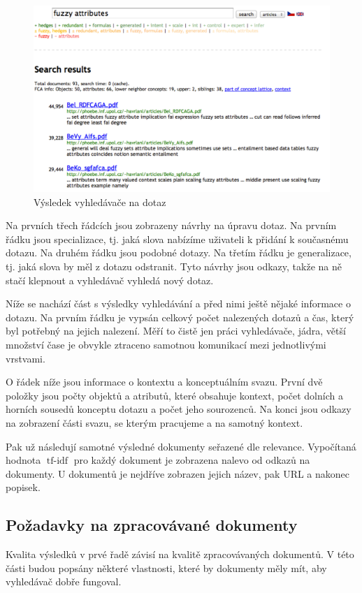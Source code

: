 \documentclass[12pt]{article}
\newcommand{\ssection}[1]{\subsection{#1}}
\DeclareMathOperator{\tfidf}{tf-idf}
\begin{document}
\begin{figure}
  \centering
  \includegraphics[width=14cm]{obrazky/gui-result1.pdf}
  \caption{Výsledek vyhledávače na dotaz }
  \label{fig.gui.result1}
\end{figure}

Na prvních třech řádcích jsou zobrazeny návrhy na úpravu dotaz. Na prvním řádku jsou specializace, tj. jaká slova nabízíme uživateli k přidání k současnému dotazu. Na druhém řádku jsou podobné dotazy. Na třetím řádku je generalizace, tj. jaká slova by měl z dotazu odstranit. Tyto návrhy jsou odkazy, takže na ně stačí klepnout a vyhledávač vyhledá nový dotaz. 

Níže se nachází část s výsledky vyhledávání a před nimi ještě nějaké informace o dotazu. Na prvním řádku je vypsán celkový počet nalezených dotazů a čas, který byl potřebný na jejich nalezení. Měří to čistě jen práci vyhledávače, jádra, větší množství čase je obvykle ztraceno samotnou komunikací mezi jednotlivými vrstvami. 

O řádek níže jsou informace o kontextu a konceptuálním svazu. První dvě položky jsou počty objektů a atributů, které obsahuje kontext, počet dolních a horních sousedů konceptu dotazu a počet jeho sourozenců. Na konci jsou odkazy na zobrazení části svazu, se kterým pracujeme a na samotný kontext.

Pak už následují samotné výsledné dokumenty seřazené dle relevance. Vypočítaná hodnota $\tfidf$ pro každý dokument je zobrazena nalevo od odkazů na dokumenty. U dokumentů je nejdříve zobrazen jejich název, pak URL a nakonec popisek. 

\ssection{Požadavky na zpracovávané dokumenty}
Kvalita výsledků v prvé řadě závisí na kvalitě zpracovávaných dokumentů. V této části budou popsány některé vlastnosti, které by dokumenty měly mít, aby vyhledávač dobře fungoval. 
\end{document}

